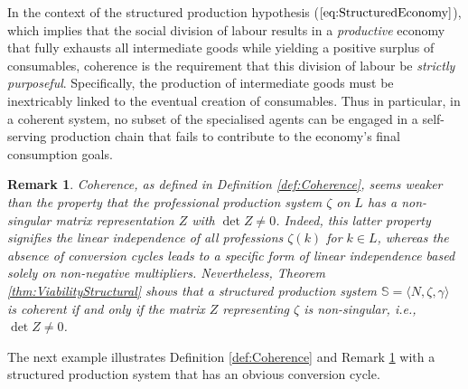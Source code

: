 \documentclass[11pt,fleqn]{article}
\newtheorem{remark}[theorem]{Remark}
\begin{document}
In the context of the structured production hypothesis ($\ref{eq:StructuredEconomy}$), which implies that the social division of labour results in a \emph{productive} economy that fully exhausts all intermediate goods while yielding a positive surplus of consumables, coherence is the requirement that this division of labour be \emph{strictly purposeful}. Specifically, the production of intermediate goods must be inextricably linked to the eventual creation of consumables. Thus in particular, in a coherent system, no subset of the specialised agents can be engaged in a self-serving production chain that fails to contribute to the economy's final consumption goals.

\begin{remark} \label{rem:Coherence}
	Coherence, as defined in Definition \ref{def:Coherence}, seems weaker than the property that the professional production system $\zeta$ on $L$ has a non-singular matrix representation $Z$ with $\det Z \neq 0$. Indeed, this latter property signifies the linear independence of all professions $\zeta(k)$ for $k \in L$, whereas the absence of conversion cycles leads to a specific form of linear independence based solely on non-negative multipliers. Nevertheless, Theorem \ref{thm:ViabilityStructural} shows that a structured production system $\mathbb{S}=\langle N, \zeta , \gamma \rangle$ is coherent if and only if the matrix $Z$ representing $\zeta$ is non-singular, i.e., $\det Z\neq 0$.
\end{remark}

\noindent The next example illustrates Definition \ref{def:Coherence} and Remark \ref{rem:Coherence} with a structured production system that has an obvious conversion cycle.
\end{document}
